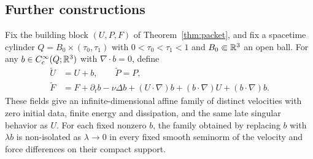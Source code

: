 \subsection{Further constructions}\label{sec:variants}
\begin{proposition}\label{prop:affine}
Fix the building block $(U,P,F)$ of Theorem~\ref{thm:packet}, and fix a spacetime cylinder $Q=B_0\times(\tau_0,\tau_1)$ with
$0<\tau_0<\tau_1<1$ and $B_0\Subset\mathbb R^3$ an open ball.
For any $b\in C_c^\infty(Q;\mathbb R^3)$ with $\nabla\cdot b=0$, define
\begin{align}
 \widetilde U&=U+b,\qquad \widetilde P=P,\nonumber\\
 \widetilde F&=F+\partial_tb-\nu\Delta b
       +(U\cdot\nabla)b+(b\cdot\nabla)U+(b\cdot\nabla)b.\label{eq:affine}
\end{align}
These fields give an infinite-dimensional affine family of distinct velocities with zero initial data, finite energy and dissipation, and the same late singular behavior as $U$. For each fixed nonzero $b$, the family obtained by replacing $b$ with $\lambda b$ is non-isolated as $\lambda\to0$ in every fixed smooth seminorm of the velocity and force differences on their compact support.
\end{proposition}
